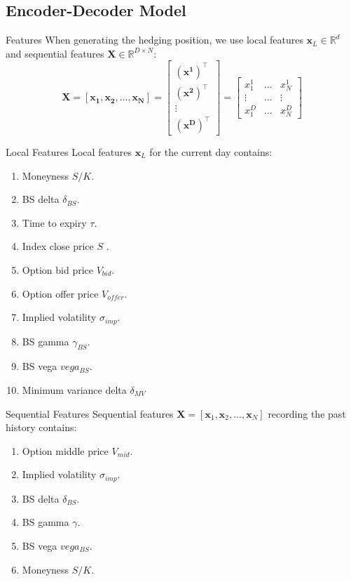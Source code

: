 \documentclass[10pt,table,mathserif]{beamer}
\newcommand{\vx}{\mathbf{x}}
\newcommand{\Real}{\mathbb{R}}
\begin{document}
\subsection{Encoder-Decoder Model}
\begin{frame}[fragile]{Features}
When generating the hedging position, we  use local features $\vx_L \in \Real^d$ and  sequential features $\mathbf{X} \in \Real^{D \times N}$:
\[
\mathbf{X}=\left[\mathbf{{x_1}},\mathbf{{x_2}},\dots,\mathbf{{x_N}}\right]=\left[
\begin{array}{c}
  (\mathbf{{x^1}})^{\top} \\
  (\mathbf{{x^2}})^{\top}  \\
 \vdots \\
  (\mathbf{{x^D}})^{\top}
\end{array}
\right]=
\left[
\begin{array}{ccc}
   x^1_1&\dots& x^1_N\\
   \vdots&\dots& \vdots\\
  x^D_1&\dots&x^D_N
\end{array}
\right]
\]
\end{frame}

\begin{frame}[fragile]{Local Features}
Local features $\vx_L$ for the current day contains:
\begin{enumerate}
	\item Moneyness $S/K$.
	\item BS delta $\delta_{BS}$.
	\item Time to expiry $\tau$.
	\item Index close price $S$ .
	\item Option bid price $V_{bid}$.
	\item Option offer price $V_{offer}$.
	\item Implied volatility $\sigma_{imp}$.
	\item BS gamma $\gamma_{BS}$.
	\item BS vega $vega_{BS}$.
	\item Minimum variance delta $\delta_{MV}$
\end{enumerate}
\end{frame}


\begin{frame}[fragile]{Sequential Features}
Sequential features $\textbf{X}=[\vx_1,\vx_2,\dots,\vx_N]$ recording the past history contains:
\begin{enumerate}
	\item  Option middle price $V_{mid}$.
	\item  Implied volatility $\sigma_{imp}$.
	\item  BS delta $\delta_{BS}$.
	\item  BS gamma $\gamma$.
	\item  BS vega $vega_{BS}$.
	\item  Moneyness $S/K$.
\end{enumerate}
\end{frame}
\end{document}
